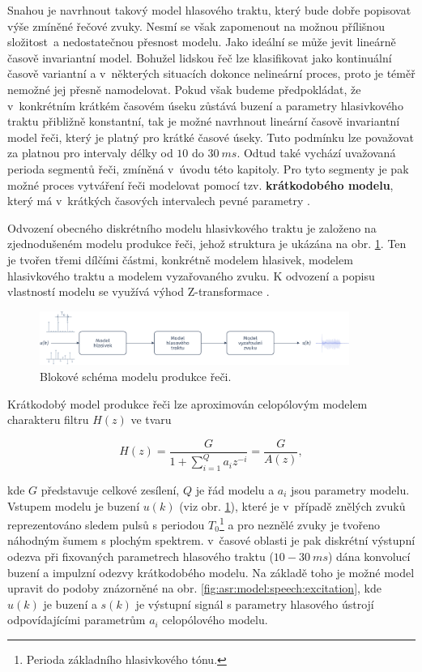 Snahou je navrhnout takový model hlasového traktu, který bude dobře popisovat výše zmíněné řečové zvuky. Nesmí se však zapomenout na možnou přílišnou složitost~a nedostatečnou přesnost modelu. Jako ideální se může jevit lineárně časově invariantní model. Bohužel lidskou řeč lze klasifikovat jako kontinuální časově variantní a v~některých situacích dokonce nelineární proces, proto je téměř nemožné jej přesně namodelovat. Pokud však budeme předpokládat, že v~konkrétním krátkém časovém úseku zůstává buzení a parametry hlasivkového traktu přibližně konstantní, tak je možné navrhnout lineární časově invariantní model řeči, který je platný pro krátké časové úseky. Tuto podmínku lze považovat za platnou pro intervaly délky od $10$ do $30\ ms$. Odtud také vychází uvažovaná perioda segmentů řeči, zmíněná v~úvodu této kapitoly. Pro tyto segmenty je pak možné proces vytváření řeči modelovat pomocí tzv. \textbf{krátkodobého modelu}, který má v~krátkých časových intervalech pevné parametry \cite{Holmes2001}.

Odvození obecného diskrétního modelu hlasivkového traktu je založeno na zjednodušeném modelu produkce řeči, jehož struktura je ukázána na obr. \ref{fig:asr:model:speech}. Ten je tvořen třemi dílčími částmi, konkrétně modelem hlasivek, modelem hlasivkového traktu a modelem vyzařovaného zvuku. K odvození a popisu vlastností modelu se využívá výhod Z-transformace \cite{Psutka2006}.

\begin{figure}[hbpt]
  \centering
  \includegraphics[width=0.9\textwidth]{./ch4-asr/img/speech_model.pdf}
  \caption{Blokové schéma modelu produkce řeči.}
  \label{fig:asr:model:speech}
\end{figure}


Krátkodobý model produkce řeči lze aproximován celopólovým modelem charakteru filtru $H(z)$ ve tvaru

\begin{equation}
  H(z) = \frac{G}{1 + \sum_{i = 1}^{Q} a_{i} z^{-i}} = \frac{G}{A(z)},
  \label{eq:asr:lpc:generic}
\end{equation}

\noindent kde $G$ představuje celkové zesílení, $Q$ je řád modelu a $a_i$ jsou parametry modelu. Vstupem modelu je buzení $u(k)$ (viz obr. \ref{fig:asr:model:speech}), které je v~případě znělých zvuků reprezentováno sledem pulsů s periodou $T_0$\footnote{Perioda základního hlasivkového tónu.} a pro neznělé zvuky je tvořeno náhodným šumem s plochým spektrem. v~časové oblasti je pak diskrétní výstupní odezva při fixovaných parametrech hlasového traktu ($10 - 30\ ms$) dána konvolucí buzení a impulzní odezvy krátkodobého modelu. Na základě toho je možné model upravit do podoby znázorněné na obr. \ref{fig:asr:model:speech:excitation}, kde $u(k)$ je buzení a $s(k)$ je výstupní signál s parametry hlasového ústrojí odpovídajícími parametrům $a_i$ celopólového modelu.

